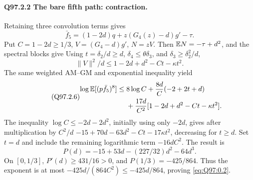 \paragraph{Q97.2.2 The bare fifth path: contraction.}
Retaining three convolution terms gives
\begin{equation}\tag{Q97.2.4}\label{eq:Q97:2.4}
\bar f_5=(1-2d)q+z(G_4(z)-d)g'-\tau.
\end{equation}
Put \(C=\allowbreak 1-2d\ge\allowbreak 1/3\), \(V=\allowbreak (G_4-d)g'\), \(N=\allowbreak zV\).
Then \(\mathbb E N=\allowbreak -\tau+d^2\), and the spectral blocks give
Using \(t=\allowbreak \delta_2/d\ge\allowbreak  d\), \(\delta_4\le\allowbreak \theta\delta_3\),
and \(\delta_3\ge\allowbreak \delta_2^2/d\),
\begin{equation}\tag{Q97.2.5}\label{eq:Q97:2.5}
\|V\|^2/d\le1-2d+d^2-Ct-\kappa t^2.
\end{equation}
The same weighted AM--GM and exponential inequality yield
\begin{equation}\tag{Q97.2.6}\label{eq:Q97:2.6}
\begin{aligned}
\log\mathbb E[(p\bar f_5)^8]\le{}&8\log C+\frac{8d}{C}(-2+2t+d)\\
&+\frac{17d}{C^2}[1-2d+d^2-Ct-\kappa t^2].
\end{aligned}
\end{equation}
The inequality \(\log C\le\allowbreak -2d-2d^2\), initially using only
\(-2d\), gives after multiplication by \(C^2/d\)
\(-15+70d-63d^2-Ct-17\kappa t^2\), decreasing for \(t\ge\allowbreak  d\).
Set \(t=\allowbreak d\) and include the remaining logarithmic term
\(-16dC^2\). The result is
\begin{equation}\tag{Q97.2.7}\label{eq:Q97:2.7}
P(d)=-15+53d-(227/32)d^2-64d^3.
\end{equation}
On \([0,\allowbreak 1/3]\), \(P'(d)\ge\allowbreak 431/16>\allowbreak 0\), and
\(P(1/3)=\allowbreak -425/864\). Thus the exponent is at most
\(-425d/(864C^2)\le\allowbreak -425d/864\), proving \eqref{eq:Q97:0.2}.

